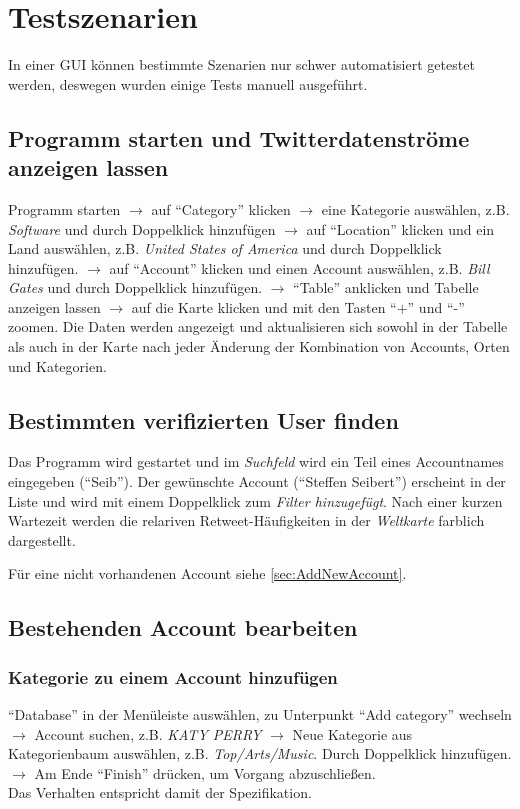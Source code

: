\section{Testszenarien}

In einer GUI können bestimmte Szenarien nur schwer automatisiert getestet werden, deswegen wurden einige Tests manuell ausgeführt.

\subsection{Programm starten und Twitterdatenströme anzeigen lassen}
Programm starten $\to$ auf "`Category"' klicken $\to$ eine Kategorie auswählen, z.B. \textit{Software} und durch Doppelklick hinzufügen $\to$ auf "`Location"' klicken und ein Land auswählen, z.B. \textit{United States of America} und durch Doppelklick hinzufügen. $\to$ auf "`Account"' klicken und einen Account auswählen, z.B. \textit{Bill Gates} und durch Doppelklick hinzufügen. $\to$ "`Table"' anklicken und Tabelle anzeigen lassen $\to$ auf die Karte klicken und mit den Tasten "`+"' und "`-"' zoomen.
Die Daten werden angezeigt und aktualisieren sich sowohl in der Tabelle als auch in der Karte nach jeder Änderung der Kombination von Accounts, Orten und Kategorien.
\subsection{Bestimmten verifizierten User finden}
Das Programm wird gestartet und im \textit{Suchfeld} wird ein Teil eines Accountnames eingegeben ("`Seib"'). Der gewünschte Account ("`Steffen Seibert"') erscheint in der Liste und wird mit einem Doppelklick zum \textit{Filter hinzugefügt}. Nach einer kurzen Wartezeit werden die relariven Retweet-Häufigkeiten in der \textit{Weltkarte} farblich dargestellt.

Für eine nicht vorhandenen Account siehe \cref{sec:AddNewAccount}.
\subsection{Bestehenden Account bearbeiten}
\subsubsection{Kategorie zu einem Account hinzufügen}
"`Database"' in der Menüleiste auswählen, zu Unterpunkt "`Add category"' wechseln $\to$ Account suchen, z.B. \textit{KATY PERRY} $\to$ Neue Kategorie aus Kategorienbaum auswählen, z.B. \textit{Top/Arts/Music}. Durch Doppelklick hinzufügen. $\to$ Am Ende "`Finish"' drücken, um Vorgang abzuschließen.\\
Das Verhalten entspricht damit der Spezifikation.


